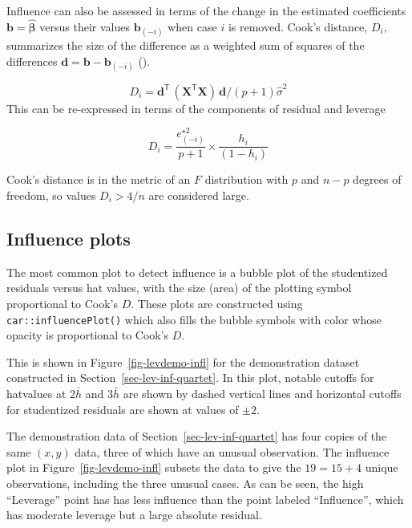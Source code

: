\documentclass[
  letterpaper,
  10pt,
  krantz2]{krantz}
\begin{document}
{Influence can also be assessed in terms of the change in the estimated
coefficients \(\mathbf{b} = \widehat{\mathbf{\beta}}\) versus their
values \(\mathbf{b}_{(-i)}\) when case \(i\) is removed. Cook's
distance, \(D_i\), summarizes the size of the difference as a weighted
sum of squares of the differences
\(\mathbf{d} =\mathbf{b} - \mathbf{b}_{(-i)}\)
().

\[
D_i = \mathbf{d}^\mathsf{T}\, (\mathbf{X}^\mathsf{T}\mathbf{X}) \,\mathbf{d} / (p+1) \hat{\sigma}^2
\] This can be re-expressed in terms of the components of residual and
leverage

\[
D_i = \frac{e^{\star 2}_{(-i)}}{p+1} \times \frac{h_i}{(1- h_i)}
\]

Cook's distance is in the metric of an \(F\) distribution with \(p\) and
\(n − p\) degrees of freedom, so values \(D_i > 4/n\) are considered
large.

\subsection{Influence plots}\label{influence-plots}

The most common plot to detect influence is a bubble plot of the
studentized residuals versus hat values, with the size (area) of the
plotting symbol proportional to Cook's \(D\). These plots are
constructed using \texttt{car::influencePlot()} which also fills the
bubble symbols with color whose opacity is proportional to Cook's \(D\).

This is shown in Figure~\ref{fig-levdemo-infl} for the demonstration
dataset constructed in Section~\ref{sec-lev-inf-quartet}. In this plot,
notable cutoffs for hatvalues at \(2 \bar{h}\) and \(3 \bar{h}\) are
shown by dashed vertical lines and horizontal cutoffs for studentized
residuals are shown at values of \(\pm 2\).

The demonstration data of Section~\ref{sec-lev-inf-quartet} has four
copies of the same \((x, y)\) data, three of which have an unusual
observation. The influence plot in Figure~\ref{fig-levdemo-infl} subsets
the data to give the \(19 = 15 + 4\) unique observations, including the
three unusual cases. As can be seen, the high ``Leverage'' point has has
less influence than the point labeled ``Influence'', which has moderate
leverage but a large absolute residual.

}
\end{document}
